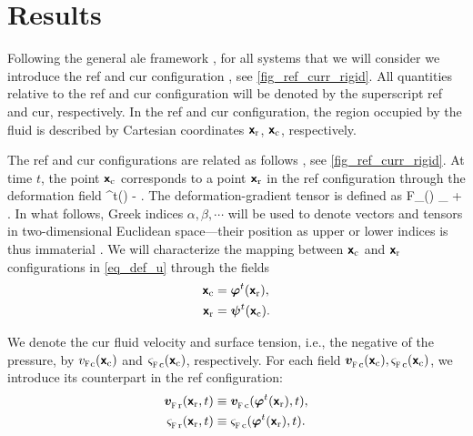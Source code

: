 \section{Results}\label{sec_results}



Following the general \ac{ale} framework \cite{doneaChapter14Arbitrary2004}, for all  systems that we will consider we  introduce the \ac{ref} and \ac{cur} configuration \cite{kamenskyLectureNotesMAE,landauTheoryElasticity1986,slaughterLinearizedTheoryElasticity2002}, see \cref{fig_ref_curr_rigid}.
All quantities relative to the \ac{ref} and \ac{cur} configuration will be denoted by the superscript \ac{ref} and \ac{cur}, respectively.
In the \ac{ref} and \ac{cur} configuration, the region occupied by the fluid is described by Cartesian coordinates ${\bm{{\mathsf{x}}}_{\textrm{r}}}$, ${\bm{{\mathsf{x}}}_{\textrm{c}}}$, respectively.

The \ac{ref} and \ac{cur} configurations are related as follows \cite{kamenskyLectureNotesMAE}, see \cref{fig_ref_curr_rigid}. At  time $t$, the point ${\bm{{\mathsf{x}}}_{\textrm{c}}}$  corresponds to a point ${\bm{{\mathsf{x}}}_{\textrm{r}}}$ in the \ac{ref} configuration through the deformation field \cite{landauFluidMechanics1987}
\be\label{eq_def_u}
\budom^t(\bxr) \equiv \bxc - \bxr.
\ee
The deformation-gradient tensor is defined as \cite{landauTheoryElasticity1986}
\be
\label{eq_def_F}
F_{\alpha \beta}(\bu) \equiv \delta_{\alpha \beta} + .
\ee
In what follows, Greek indices $\alpha, \beta, \cdots$ will be used to denote vectors and tensors in  two-dimensional Euclidean space---their position as upper or lower indices is thus immaterial \cite{marchiafavaAppuntiDiGeometria2005,landauTheoryElasticity1986}.
We will characterize  the mapping between ${\bm{{\mathsf{x}}}_{\textrm{c}}}$ and ${\bm{{\mathsf{x}}}_{\textrm{r}}}$ configurations in \cref{eq_def_u} through the fields
\begin{align}\label{eq_def_phi}
        {\bm{{\mathsf{x}}}_{\textrm{c}}} & = \bm{\varphi}^t({\bm{{\mathsf{x}}}_{\textrm{r}}}), \\
        \label{eq_def_psi}
        {\bm{{\mathsf{x}}}_{\textrm{r}}} & = \bm{\psi}^t({\bm{{\mathsf{x}}}_{\textrm{c}}}).
\end{align}

We denote the \ac{cur} fluid velocity and surface tension, i.e., the negative of the pressure, by $\vfc(\bxc)$ and $\sigmafc{}(\bxc)$, respectively.
For each field $\bvfc{}({\bxc}), \sigmafc{}(\bxc)$, we introduce its counterpart in the \ac{ref} configuration:
\begin{align}
        \label{eq_vf_ref}
        \bvfr{}(\bxr, t)    & \equiv \bvfc{}(\bm{\varphi}^t(\bxr), t),      \\
        \label{eq_sigmaf_ref}
        \sigmafr{}(\bxr, t) & \equiv  \sigmafc{}( \bm{\varphi}^t(\bxr), t).
\end{align}

